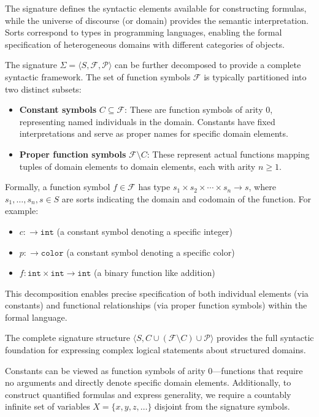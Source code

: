 \documentclass[11pt,a4paper]{article}
\theoremstyle{definition}
\theoremstyle{plain}
\theoremstyle{remark}
\begin{document}
The signature defines the syntactic elements available for constructing formulas, while the universe of discourse (or domain) provides the semantic interpretation. Sorts correspond to types in programming languages, enabling the formal specification of heterogeneous domains with different categories of objects.

The signature $\Sigma = \langle S, \mathcal{F}, \mathcal{P} \rangle$ can be further decomposed to provide a complete syntactic framework. The set of function symbols $\mathcal{F}$ is typically partitioned into two distinct subsets:

\begin{itemize}
    \item \textbf{Constant symbols} $C \subseteq \mathcal{F}$: These are function symbols of arity 0, representing named individuals in the domain. Constants have fixed interpretations and serve as proper names for specific domain elements.

    \item \textbf{Proper function symbols} $\mathcal{F} \setminus C$: These represent actual functions mapping tuples of domain elements to domain elements, each with arity $n \geq 1$.
\end{itemize}

Formally, a function symbol $f \in \mathcal{F}$ has type $s_1 \times s_2 \times \cdots \times s_n \rightarrow s$, where $s_1, \dots, s_n, s \in S$ are sorts indicating the domain and codomain of the function. For example:
\begin{itemize}
    \item $c : \rightarrow \texttt{int}$ (a constant symbol denoting a specific integer)
    \item $p : \rightarrow \texttt{color}$ (a constant symbol denoting a specific color)
    \item $f : \texttt{int} \times \texttt{int} \rightarrow \texttt{int}$ (a binary function like addition)
\end{itemize}

This decomposition enables precise specification of both individual elements (via constants) and functional relationships (via proper function symbols) within the formal language.

The complete signature structure $\langle S, C \cup (\mathcal{F} \setminus C) \cup \mathcal{P} \rangle$ provides the full syntactic foundation for expressing complex logical statements about structured domains.

Constants can be viewed as function symbols of arity 0---functions that require no arguments and directly denote specific domain elements. Additionally, to construct quantified formulas and express generality, we require a countably infinite set of variables $X = \{x, y, z, \dots\}$ disjoint from the signature symbols. 
\end{document}
